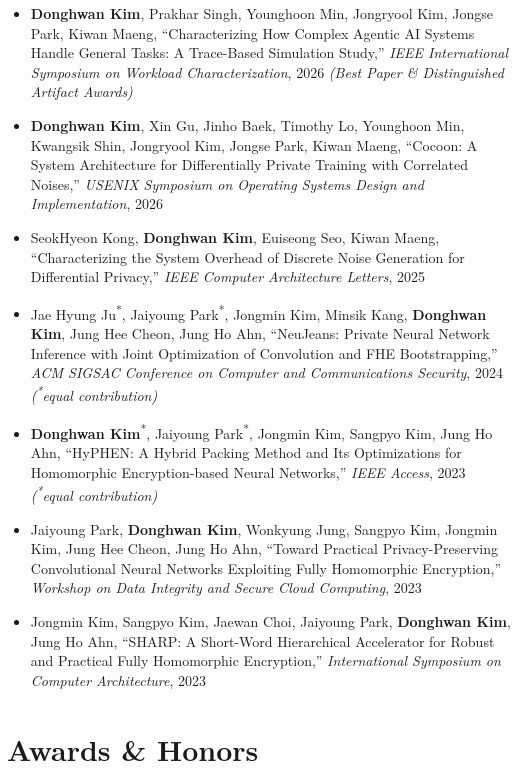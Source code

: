 \documentclass[11pt,letterpaper]{article}
\newenvironment{publist}
  {\begin{itemize}[leftmargin=5.4em,labelwidth=5.0em,labelsep=0.4em,align=left,
                   itemsep=0.3em,topsep=0.2em,parsep=0pt]%
   \hyphenpenalty=10000 \exhyphenpenalty=10000 \sloppy}
  {\end{itemize}}
\newcommand{\pub}[1]{\item[{[\textbf{#1}]}]}
\newcommand{\me}{\textbf{Donghwan Kim}}
\newcommand{\eq}{\textsuperscript{*}}
\newcommand{\award}[1]{\textit{(#1)}}
\begin{document}
\begin{publist}
\pub{IISWC'26} \me, Prakhar Singh, Younghoon Min, Jongryool Kim, Jongse Park,
  Kiwan Maeng, ``Characterizing How Complex Agentic AI Systems Handle General Tasks:
  A Trace-Based Simulation Study,'' \textit{IEEE International Symposium on Workload
  Characterization}, 2026 \award{Best Paper \& Distinguished Artifact Awards}

\pub{OSDI'26} \me, Xin Gu, Jinho Baek, Timothy Lo, Younghoon Min, Kwangsik Shin,
  Jongryool Kim, Jongse Park, Kiwan Maeng, ``Cocoon: A System Architecture for
  Differentially Private Training with Correlated Noises,'' \textit{USENIX Symposium on
  Operating Systems Design and Implementation}, 2026

\pub{CAL'25} SeokHyeon Kong, \me, Euiseong Seo, Kiwan Maeng, ``Characterizing
  the System Overhead of Discrete Noise Generation for Differential Privacy,''
  \textit{IEEE Computer Architecture Letters}, 2025

\pub{CCS'24} Jae Hyung Ju\eq, Jaiyoung Park\eq, Jongmin Kim, Minsik Kang, \me,
  Jung Hee Cheon, Jung Ho Ahn,
  ``NeuJeans: Private Neural Network Inference with Joint Optimization of Convolution
  and FHE Bootstrapping,'' \textit{ACM SIGSAC Conference on Computer and Communications
  Security}, 2024 \award{\eq equal contribution}

\pub{Access'23} \me\eq, Jaiyoung Park\eq, Jongmin Kim, Sangpyo Kim,
  Jung Ho Ahn, ``HyPHEN: A Hybrid Packing Method and Its Optimizations for Homomorphic
  Encryption-based Neural Networks,'' \textit{IEEE Access}, 2023
  \award{\eq equal contribution}

\pub{DISCC'23} Jaiyoung Park, \me, Wonkyung Jung, Sangpyo Kim, Jongmin Kim,
  Jung Hee Cheon, Jung Ho Ahn, ``Toward Practical Privacy-Preserving Convolutional
  Neural Networks Exploiting Fully Homomorphic Encryption,'' \textit{Workshop on Data
  Integrity and Secure Cloud Computing}, 2023

\pub{ISCA'23} Jongmin Kim, Sangpyo Kim, Jaewan Choi, Jaiyoung Park, \me,
  Jung Ho Ahn, ``SHARP: A Short-Word Hierarchical Accelerator for Robust and Practical
  Fully Homomorphic Encryption,'' \textit{International Symposium on Computer
  Architecture}, 2023
\end{publist}

\section{Awards \& Honors}
\end{document}
